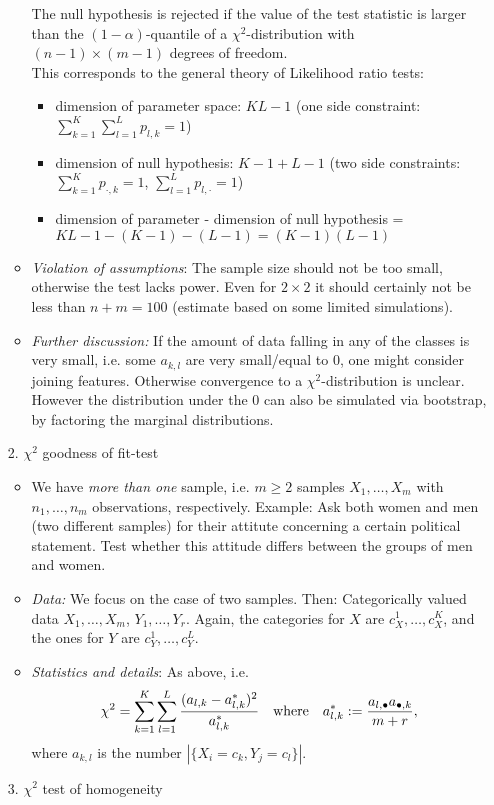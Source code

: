 \documentclass[12pt,a4paper]{amsart}
\theoremstyle{definition}
\theoremstyle{remark}
\numberwithin{equation}{section}
\begin{document}
\begin{itemize}
\begin{itemize}
 The null hypothesis is rejected if the value of the test statistic is larger than the $(1-\alpha)$-quantile of a $\chi^2$-distribution with $(n-1)\times (m-1)$ degrees of freedom.\\
This corresponds to the general theory of Likelihood ratio tests: 
\begin{itemize}
\item dimension of parameter space: $KL-1$ (one side constraint: $\sum_{k=1}^K \sum_{l=1}^L p_{l,k}=1$)
\item dimension of null hypothesis: $K-1+L-1$ (two side constraints: $\sum_{k=1}^K p_{\cdot,k}=1$, $\sum_{l=1}^L p_{l,\cdot}=1$)
\item dimension of parameter - dimension of null hypothesis = $KL-1-(K-1)-(L-1)=(K-1)(L-1)$
\end{itemize}
\item \textit{Violation of assumptions}: The sample size should not be too small, otherwise the test lacks power. Even for $2\times 2$ it should certainly not be less than $n+m=100$ (estimate based on some limited simulations).

\item \textit{Further discussion:} If the amount of data falling in any of the classes is very small, i.e. some $a_{k,l}$ are very small/equal to $0$, one might consider joining features. Otherwise convergence to a $\chi^2$-distribution is unclear. However the distribution under the $0$  can also be simulated via bootstrap, by factoring the marginal distributions.  \\
\end{itemize}


\item[2.] $\chi^2$ goodness of fit-test 
\begin{itemize}
\item We have \textit{more than one} sample, i.e. $m\geq 2$ samples $X_1,\ldots,X_m$ with $n_1,\ldots,n_m$ observations, respectively. Example: Ask both women and men (two different samples) for their attitute concerning a certain political statement. Test whether this attitude differs between the groups of men and women. 
\item \textit{Data:} We focus on the case of two samples. Then: Categorically valued data $X_1,\ldots, X_{m}$, $Y_1, \ldots,Y_r$. Again, the categories for $X$ are $c_X^{1}, \ldots, c_X^{K}$, and the ones for $Y$ are $c_{Y}^{1},\ldots,c_{Y}^{L}$.
\item \textit{Statistics and details}: As above, i.e.
$$\chi^2=\sum_{k=1}^K \sum_{l=1} ^L \frac{(a_{l,k}-a_{l,k}^*)^2}{a_{l,k}^*} \quad \textnormal{where} \quad a_{l,k}^*:=\frac{a_{l, \bullet}a_{\bullet,k}}{m+r},$$
where $a_{k,l}$ is the number  $|\{X_i=c_k, Y_j=c_l\}|$.
\end{itemize}
\item[3.] $\chi^2$ test of homogeneity
\end{itemize}
\end{document}
